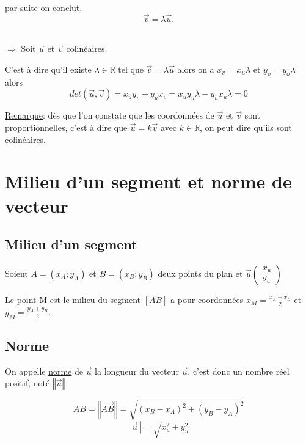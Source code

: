 \documentclass[french]{book}
\newcommand{\norme}[1]{\left\Vert #1\right\Vert}
\begin{document}
\begin{demo}
\begin{itemize}
par suite on conclut, $$\overrightarrow{v}= \lambda \overrightarrow{u}.$$ \\

\end{itemize}

$\Longrightarrow$ Soit $\overrightarrow{u}$ et $\overrightarrow{v}$ colinéaires. 

C'est à dire qu'il existe $\lambda \in \mathbb{R}$ tel que $\overrightarrow{v}=\lambda \overrightarrow{u}$ alors on a $x_v=x_u \lambda$ et $y_v= y_u \lambda$ alors $$det(\overrightarrow{u}, \overrightarrow{v})=x_u y_v - y_u x_v = x_u y_u \lambda - y_u x_u \lambda = 0$$



\end{demo}

\underline{Remarque}: dès que l’on constate que les coordonnées de $\overrightarrow{u}$ et $\overrightarrow{v}$ sont proportionnelles, c'est à dire que $\overrightarrow{u}=k \overrightarrow{v}$ avec $k \in \mathbb{R}$, on peut dire qu’ils sont colinéaires.

\newpage

\section{Milieu d’un segment et norme de vecteur}

\subsection{Milieu d’un segment}
Soient $A=(x_A;y_A)$ et $B=(x_B;y_B)$ deux points du plan et $\overrightarrow{u}\left( \begin{array}{c}
x_u \\
y_u 
\end{array} \right)$

\begin{prop}
Le point M est le milieu du segment $[AB]$ a pour coordonnées $x_M=\frac{x_A+x_B}{2}$ et  $y_M=\frac{y_A+y_B}{2}$.
\end{prop}

\subsection{Norme}

\begin{defn}

On appelle \underline{norme} de $\overrightarrow{u}$ la longueur du vecteur $\overrightarrow{u}$, c’est donc un nombre réel \underline{positif}, noté $\norme{\overrightarrow{u}}$.
\vspace{4mm}

\end{defn}

 
\begin{prop}
$$AB=\norme{\overrightarrow{AB}}=\sqrt{(x_B-x_A)^2+(y_B-y_A)^2}$$
$$\norme{\overrightarrow{u}}=\sqrt{x_{u}^2+y_{u}^2}$$
\end{prop}

\end{document}
